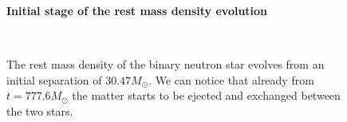 \begin{figure}
\centering
    \textbf{Initial stage of the rest mass density evolution}\par\medskip
\centering
{} \quad
    \quad
{} \quad
{} \quad
 \\
\caption{The rest mass density of the binary neutron star evolves from an initial separation of $30.47 M_{\odot}$. We can notice that already from $t=777.6 M_{\odot}$ the matter starts to be ejected and exchanged between the two stars.}
\label{f_1234}
\end{figure}
